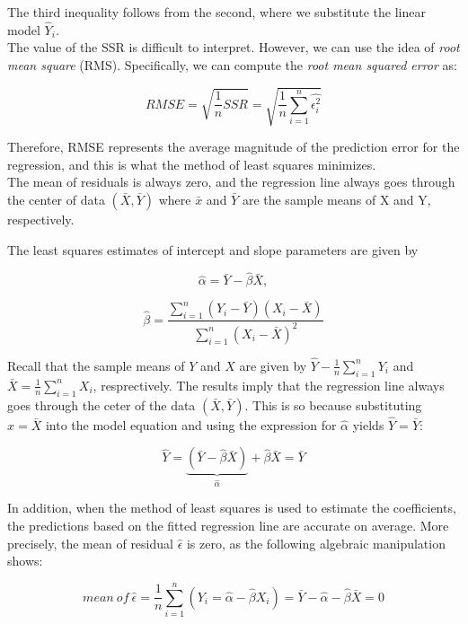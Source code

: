 \documentclass{article}
\begin{document}
    \noindent The third inequality follows from the second, where we
substitute the linear model $\hat{Y}_i$.\\

    \noindent The value of the SSR is difficult to interpret. However, we
can use the idea of \textit{root mean square} (RMS). Specifically, we can
compute the \textit{root mean squared error} as:

    \[
        RMSE = \sqrt{\frac{1}{n}SSR} = \sqrt{\frac{1}{n}\sum^{n}_{i=1}\hat{\epsilon^2_i}}
    \]

    Therefore, RMSE represents the average magnitude of the prediction error
    for the regression, and this is what the method of least squares
    minimizes.\\

    \noindent The mean of residuals is always zero, and the regression line
always goes through the center of data $(\bar{X}, \bar{Y})$ where
$\bar{x}$ and $\bar{Y}$ are the sample means of X and Y, respectively.

\noindent The least squares estimates of intercept and slope parameters are
given by

    \[
        \hat{\alpha} = \bar{Y} - \hat{\beta}\bar{X},
    \]

    \[
        \hat{\beta} = \frac{\sum^{n}_{i=1}(Y_i - \bar{Y})(X_i - \bar{X})}{\sum^{n}_{i=1}(X_i - \bar{X})^2}
    \]

    \noindent Recall that the sample means of $Y$ and $X$ are given by
$\hat{Y} - \frac{1}{n}\sum^{n}_{i=1}Y_i$ and
$\bar{X} = \frac{1}{n}\sum^{n}_{i=1}X_i$, resprectively. The results imply
that the regression line always goes through the ceter of the data $(\bar{X}, \bar{Y})$. This is so because substituting $x = \bar{X}$ into the model equation and using the expression for $\hat{\alpha}$ yields $\hat{Y} = \bar{Y}$:

    \[
        \hat{Y} = \underbrace{(\bar{Y}-\hat{\beta}\bar{X})}_{\hat{\alpha}}+\hat{\beta}\bar{X} = \bar{Y}
    \]

    \noindent In addition, when the method of least squares is used to
estimate the coefficients, the predictions based on the fitted regression
line are accurate on average. More precisely, the mean of residual
$\hat{\epsilon}$ is zero, as the following algebraic manipulation shows:

    \[
        mean \ of \ \hat{\epsilon} = \frac{1}{n}\sum^{n}_{i=1}(Y_i = \hat{\alpha}-\hat{\beta}X_i) = \bar{Y} - \hat{\alpha} - \hat{\beta}\bar{X} = 0
    \]
\end{document}

